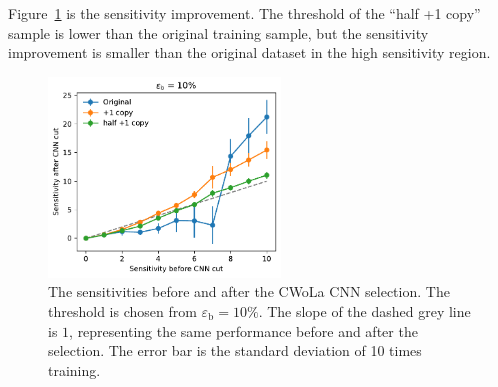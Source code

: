 \documentclass[12pt]{article}
\begin{document}
			Figure~\ref{fig:sensitivity_improvement_bkg_eff_01_half_copy_1} is the sensitivity improvement. The threshold of the ``half +1 copy'' sample is lower than the original training sample, but the sensitivity improvement is smaller than the original dataset in the high sensitivity region.
			\begin{figure}[htpb]
				\centering
				\includegraphics[width=0.55\textwidth]{HVmodel_sensitivity_improvement_bkg_eff_10_half_copy_1.pdf}
				\caption{The sensitivities before and after the CWoLa CNN selection. The threshold is chosen from $\varepsilon_{\text{b}} = 10\%$. The slope of the dashed grey line is $1$, representing the same performance before and after the selection. The error bar is the standard deviation of 10 times training.}
				\label{fig:sensitivity_improvement_bkg_eff_01_half_copy_1}
			\end{figure}
\end{document}
